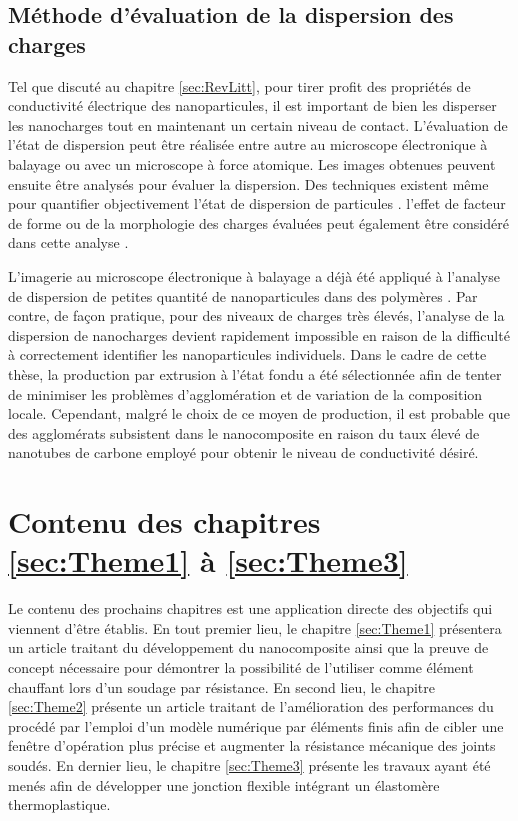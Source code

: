 \subsection{Méthode d'évaluation de la dispersion des charges}

Tel que discuté au chapitre \ref{sec:RevLitt}, pour tirer profit des propriétés de conductivité électrique des nanoparticules, il est important de bien les disperser les nanocharges tout en maintenant un certain niveau de contact. 
L'évaluation de l'état de dispersion peut être réalisée entre autre au microscope électronique à balayage ou avec un microscope à force atomique. 
Les images obtenues peuvent ensuite être analysés pour évaluer la dispersion. 
Des techniques existent même pour quantifier objectivement l'état de dispersion de particules \cite{Bray2011,Bray2012}. 
l'effet de facteur de forme ou de la morphologie des charges évaluées peut également être considéré dans cette analyse \cite{Bray2013a,Sul2011}. 

L'imagerie au microscope électronique à balayage a déjà été appliqué à l'analyse de dispersion de petites quantité de nanoparticules dans des polymères \cite{Xie2005,Diez-Pascual2009,Xin2011,Grossiord2008a,Bauhofer2009,Abbas2016}. 
Par contre, de façon pratique, pour des niveaux de charges très élevés, l'analyse de la dispersion de nanocharges devient rapidement impossible en raison de la difficulté à correctement identifier les nanoparticules individuels. 
Dans le cadre de cette thèse, la production par extrusion à l'état fondu a été sélectionnée afin de tenter de minimiser les problèmes d'agglomération et de variation de la composition locale. 
Cependant, malgré le choix de ce moyen de production, il est probable que des agglomérats subsistent dans le nanocomposite en raison du taux élevé de nanotubes de carbone employé pour obtenir le niveau de conductivité désiré. 

\section{Contenu des chapitres \ref{sec:Theme1} à \ref{sec:Theme3}}

Le contenu des prochains chapitres est une application directe des objectifs qui viennent d'être établis. 
En tout premier lieu, le chapitre \ref{sec:Theme1} présentera un article traitant du développement du nanocomposite ainsi que la preuve de concept nécessaire pour démontrer la possibilité de l'utiliser comme élément chauffant lors d'un soudage par résistance. 
En second lieu, le chapitre \ref{sec:Theme2} présente un article traitant de l'amélioration des performances du procédé par l'emploi d'un modèle numérique par éléments finis afin de cibler une fenêtre d'opération plus précise et augmenter la résistance mécanique des joints soudés. 
En dernier lieu, le chapitre \ref{sec:Theme3} présente les travaux ayant été menés afin de développer une jonction flexible intégrant un élastomère thermoplastique. 

